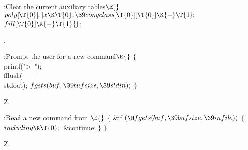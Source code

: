 \Y\B\4:Clear the current auxiliary tables\X${}\E{}$\6
$\\{poly}[\T{0}].\|x\K\T{0},\39\\{congclass}[\T{0}][\T{0}]\K{-}\T{1};{}$\6
${}\\{fill}[\T{0}]\K{-}\T{1}{}$;\par
{}.\fi

\B{}:Prompt the user for a new command\X${}\E{}$\6
${}\{{}$\1\6
\\{printf}(\.{">\ "});\5
\\{fflush}(\\{stdout});\6
${}\\{fgets}(\\{buf},\39\\{bufsize},\39\\{stdin});{}$\6
\4${}\}{}$\2\par
\U2.\fi

\B{}:Read a new command from \X${}\E{}$%
\6
${}\{{}$\1\6
\&{if} ${}(\R\\{fgets}(\\{buf},\39\\{bufsize},\39\\{infile})){}$\5
${}\{{}$\1\6
${}\\{including}\K\T{0};{}$\6
\&{continue};\6
\4${}\}{}$\2\6
\4${}\}{}$\2\par
\U2.\fi

